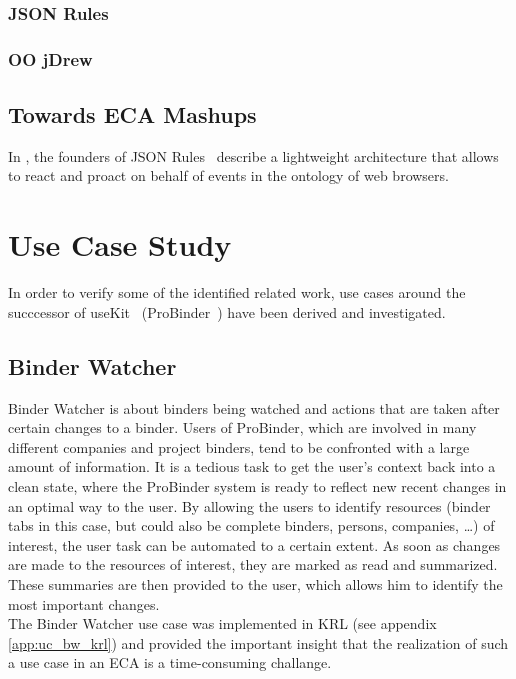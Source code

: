 \documentclass[11pt]{article}%
\begin{document}


\subsubsection{JSON Rules}


\subsubsection{OO jDrew}


\subsection{Towards ECA Mashups}
In \cite{2009-Pascalau_Giurca-LWAECARE.pdf}, the founders of JSON Rules~\cite{2008-Giurca_Pascalau-JSON_Rules.pdf} describe a lightweight architecture that allows to react and proact on behalf of events in the ontology of web browsers.



\section{Use Case Study}
In order to verify some of the identified related work, use cases around the succcessor of useKit~\cite{2010-Rizzotti_Burkhart-useKit.pdf} (ProBinder~\cite{wwwprobinder}) have been derived and investigated. 

\subsection{Binder Watcher}
Binder Watcher is about binders being watched and actions that are taken after certain changes to a binder. Users of ProBinder, which are involved in many different companies and project binders, tend to be confronted with a large amount of information. It is a tedious task to get the user's context back into a clean state, where the ProBinder system is ready to reflect new recent changes in an optimal way to the user. By allowing the users to identify resources (binder tabs in this case, but could also be complete binders, persons, companies, \dots) of interest, the user task can be automated to a certain extent. As soon as changes are made to the resources of interest, they are marked as read and summarized. These summaries are then provided to the user, which allows him to identify the most important changes.
\\
The Binder Watcher use case was implemented in KRL (see appendix \ref{app:uc_bw_krl}) and provided the important insight that the realization of such a use case in an ECA is a time-consuming challange. 
\end{document}

